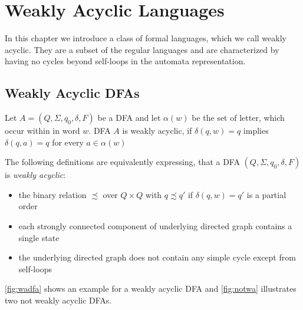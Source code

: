\chapter{Weakly Acyclic Languages}\label{chapter:weakly_acyclic_language}

In this chapter we introduce a class of formal languages, which we call weakly acyclic. They are a subset of the regular languages and are characterized by having no cycles beyond self-loops in the automata representation.

\section{Weakly Acyclic DFAs}\label{sec:weakly_acyclic_dfa}

\begin{definition}
Let $A = (Q, \Sigma, q_{0},\delta,F)$ be a DFA and let $\alpha(w)$ be the set of letter, which occur within in word $w$. DFA $A$ is weakly acyclic, if $\delta(q,w) = q$ implies $\delta(q,a) = q$ for every $a \in \alpha(w)$
\end{definition}

The following definitions are equivalently expressing, that a DFA $(Q, \Sigma, q_{0},\delta,F)$ is \textit{weakly acyclic}:
\begin{itemize}[--,noitemsep]
	\item the binary relation $\precsim $  over $Q \times Q$ with $q \precsim q'$ if $\delta(q,w) = q'$ is a partial order
	\item each strongly connected component of underlying directed graph contains a single state 
	\item the underlying directed graph does not contain any simple cycle except from self-loops
\end{itemize}

\autoref{fig:wadfa} shows an example for a weakly acyclic DFA and \autoref{fig:notwa} illustrates two not weakly acyclic DFAs.


